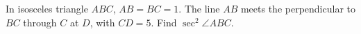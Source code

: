 In isosceles triangle $ABC$, $AB=BC=1$. The line $AB$ meets the perpendicular to $BC$ through $C$ at $D$, with $CD=5$. Find $\sec^2\angle ABC$.
